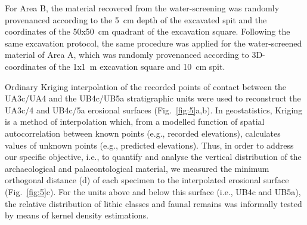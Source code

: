 \documentclass[preprint,authoryear,times]{elsarticle} %
\begin{document}
\begin{table}[]
  \caption{List of sampled observations for the vertical distribution and point pattern analyses.}
  \label{tab:2}
  \vspace{0.1in}
\end{table}

For Area B, the material recovered from the water-screening was randomly provenanced according to the 5~cm depth of the excavated spit and the coordinates of the 50x50~cm quadrant of the excavation square. Following the same excavation protocol, the same procedure was applied for the water-screened material of Area A, which was randomly provenanced according to 3D-coordinates of the 1x1~m excavation square and 10~cm spit.

Ordinary Kriging interpolation of the recorded points of contact between the UA3c/UA4 and the UB4c/UB5a stratigraphic units were used to reconstruct the UA3c/4 and UB4c/5a erosional surfaces (Fig.~\ref{fig:5}a,b). In geostatistics, Kriging is a method of interpolation which, from a modelled function of spatial autocorrelation between known points (e.g., recorded elevations), calculates values of unknown points (e.g., predicted elevations). Thus, in order to address our specific objective, i.e., to quantify and analyse the vertical distribution of the archaeological and palaeontological material, we measured the minimum orthogonal distance (d) of each specimen to the interpolated erosional surface (Fig.~\ref{fig:5}c). For the units above and below this surface (i.e., UB4c and UB5a), the relative distribution of lithic classes and faunal remains was informally tested by means of kernel density estimations.
\end{document}
